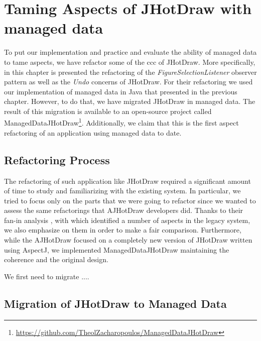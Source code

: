 
\chapter{Taming Aspects of JHotDraw \newline with managed data}\label{AspectRefactoring}

To put our implementation and practice and evaluate the ability of managed data to tame aspects, we have refactor some of the \ac{ccc} of JHotDraw.
More specifically, in this chapter is presented the refactoring of the \textit{FigureSelectionListener} observer pattern as well as the \textit{Undo} concerns of JHotDraw.
For their refactoring we used our implementation of managed data in Java that presented in the previous chapter.
However, to do that, we have migrated JHotDraw in managed data.
The result of this migration is available to an open-source project called ManagedDataJHotDraw\footnote{\url{https://github.com/TheolZacharopoulos/ManagedDataJHotDraw}}.
Additionally, we claim that this is the first aspect refactoring of an application using managed data to date.

\section{Refactoring Process}
The refactoring of such application like JHotDraw required a significant amount of time to study and familiarizing with the existing system.
In particular, we tried to focus only on the parts that we were going to refactor since we wanted to assess the same refactorings that AJHotDraw developers \cite{marinajhotdraw} did.
Thanks to their fan-in analysis \cite{marin2004identifying}, with which identified a number of aspects in the legacy system, we also emphasize on them in order to make a fair comparison.
Furthermore, while the AJHotDraw focused on a completely new version of JHotDraw written using AspectJ, we implemented ManagedDataJHotDraw maintaining the coherence and the original design.

We first need to migrate ....

\section{Migration of JHotDraw to Managed Data}

